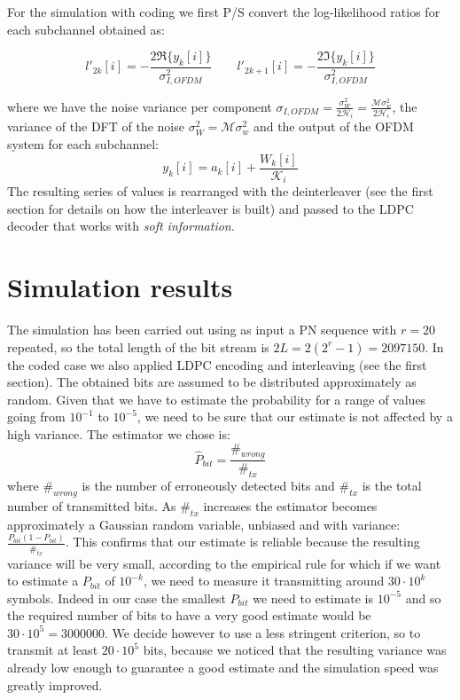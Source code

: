 \documentclass[a4paper,11.5pt]{article}
\begin{document}
For the simulation with coding we first P/S convert the log-likelihood ratios for each subchannel obtained as:

\begin{equation}
l'_{2k}[i] =- \frac{2 \Re\{y_k[i]\}}{\sigma_{I,OFDM}^2} \quad \quad
l'_{2k+1}[i]= - \frac{2 \Im\{y_k[i]\}}{\sigma_{I,OFDM}^2}
\end{equation}

where we have the noise variance per component $\sigma_{I,OFDM} = \frac{\sigma_W^2}{2 \mathcal{H}_i}=\frac{\mathcal{M} \sigma_w^2}{2 \mathcal{H}_i}$, the variance of the DFT of the noise $\sigma_W^2 = \mathcal{M} \sigma_w^2$ and the output of the OFDM system for each subchannel:
\begin{equation} \label{eq:outOFDM}
 y_k[i] = a_k[i] + \frac{W_k[i]}{\mathcal{K}_i}
\end{equation}
 The resulting series of values is rearranged with the deinterleaver (see the first section for details on how the interleaver is built) and passed to the LDPC decoder that works with \emph{soft information}.

\section*{Simulation results}

The simulation has been carried out using as input a PN sequence with $r=20$ repeated, so the total length of the bit stream is $2L = 2(2^r-1) = 2097150$. In the coded case we also applied LDPC encoding and interleaving (see the first section). The obtained bits are assumed to be distributed approximately as random. Given that we have to estimate the probability for a range of values going from $10^{-1}$ to $10^{-5}$, we need to be sure that our estimate is not affected by a high variance. The estimator we chose is:
\begin{equation}
\hat{P}_{bit} = \frac{\#_{wrong}}{\#_{tx}}
\end{equation}
where $\#_{wrong}$ is the number of erroneously detected bits and $\#_{tx}$ is the total number of transmitted bits. As $\#_{tx}$ increases the estimator becomes approximately a Gaussian random variable, unbiased and with variance: $\frac{P_{bit} (1-P_{bit})}{\#_{tx}}$. This confirms that our estimate is reliable because the resulting variance will be very small, according to the empirical rule for which if we want to estimate a $P_{bit}$ of $10^{-k}$, we need to measure it transmitting around $30\cdot 10^{k}$ symbols. Indeed in our case the smallest $P_{bit}$ we need to estimate is $10^{-5}$ and so the required number of bits to have a very good estimate would be $30\cdot 10^{5}= 3000000$. We decide however to use a less stringent criterion, so to transmit at least $20\cdot 10^5$ bits, because we noticed that the resulting variance was already low enough to guarantee a good estimate and the simulation speed was greatly improved.
\end{document}
